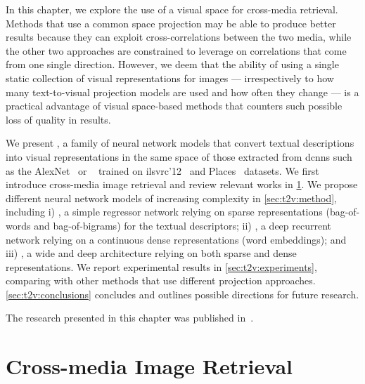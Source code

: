 In this chapter, we explore the use of a visual space for cross-media retrieval.
Methods that use a common space projection may be able to produce better results because they can exploit cross-correlations between the two media, while the other two approaches are constrained to leverage on correlations that come from one single direction.
However, we deem that the ability of using a single static collection of visual representations for images --- irrespectively to how many text-to-visual projection models are used and how often they change --- is a practical advantage of visual space-based methods that counters such possible loss of quality in results.

We present %
\ttv{}, a family of neural network models that convert textual descriptions into visual representations in the same space of those extracted from \glspl{dcnn} such as the AlexNet~\cite{krizhevsky2012imagenet} or \resnet{}~\cite{he2016deep} trained on \gls{ilsvrc}'12~\cite{russakovsky2015imagenet} and Places~\cite{zhou2014learning} datasets.
We first introduce cross-media image retrieval and review relevant works in \ref{sec:t2v:related}.
We propose different neural network models of increasing complexity in \ref{sec:t2v:method}, including i) \sparsettv{}, a simple regressor network relying on sparse representations (bag-of-words and bag-of-bigrams) for the textual descriptors; ii) \densettv{}, a deep recurrent network relying on a continuous dense representations (word embeddings); and iii) \widedeepttv{}, a wide and deep architecture relying on both sparse and dense representations.
We report experimental results in \ref{sec:t2v:experiments}, comparing with other methods that use different projection approaches.
\ref{sec:t2v:conclusions} concludes and outlines possible directions for future research.

The research presented in this chapter was published in~\cite{carrara2016picture,carrara2018picture}.



\section{Cross-media Image Retrieval}
\label{sec:t2v:related}

